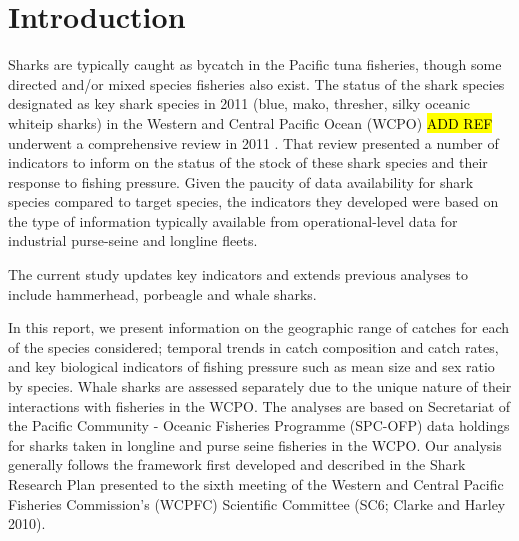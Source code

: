 \documentclass[12pt]{SCreport}
\begin{document}
\wcpfctitlepage

\tableofcontents


\section{Introduction} %



Sharks are typically caught as bycatch in the Pacific tuna fisheries, though some directed and/or mixed species fisheries also exist. The status of the shark species designated as key shark species in 2011 (blue, mako, thresher, silky oceanic whiteip  sharks) in the Western and Central Pacific Ocean (WCPO) \hl{ADD REF} underwent a comprehensive review in 2011 \citep{Clarke2011_a}. That review presented a number of indicators to inform on the status of the stock of these shark species and their response to fishing pressure. Given the paucity of data availability for shark species compared to target species, the indicators they developed were based on the type of information typically available from operational-level data for industrial purse-seine and longline fleets. 

The current study updates key indicators and extends previous analyses to include hammerhead, porbeagle and whale sharks.  

In this report, we present information on the geographic range of catches for each of the species considered; temporal trends in catch composition and catch rates, and key biological indicators of fishing pressure such as mean size and sex ratio by species. Whale sharks are assessed separately due to the unique nature of their interactions with fisheries in the WCPO. The analyses are based on Secretariat of the Pacific Community - Oceanic Fisheries Programme (SPC-OFP) data holdings for sharks taken in longline and purse seine fisheries in the WCPO.  Our analysis generally follows the framework first developed and described in the Shark Research Plan presented to the sixth meeting of the Western and Central Pacific Fisheries Commission's (WCPFC) Scientific Committee (SC6; Clarke and Harley 2010). 
\end{document}

